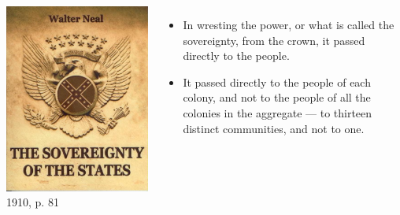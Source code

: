 \begin{frame}
    \begin{columns}[onlytextwidth]
            \centering
            \includegraphics[height=0.75\textheight]{img/walter-neal-book.jpg} \\
            1910,  p. 81\\

            \begin{itemize}
                \item In wresting the power, or what is called the sovereignty, from the crown, it passed directly to the people.
                \item It passed directly to the people of each colony, and not to the people of all the colonies in the aggregate --- to thirteen distinct communities, and not to one.
            \end{itemize}
    \end{columns}
\end{frame}

